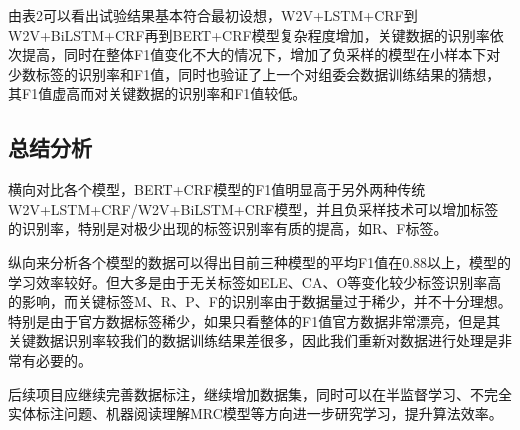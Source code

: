 \documentclass{article}
\begin{document}
由表2可以看出试验结果基本符合最初设想，W2V+LSTM+CRF到W2V+BiLSTM+CRF再到BERT+CRF模型复杂程度增加，关键数据的识别率依次提高，同时在整体F1值变化不大的情况下，增加了负采样的模型在小样本下对少数标签的识别率和F1值，同时也验证了上一个对组委会数据训练结果的猜想，其F1值虚高而对关键数据的识别率和F1值较低。

\newpage
\begin{center}
	\section{总结分析}
\end{center}


横向对比各个模型，BERT+CRF模型的F1值明显高于另外两种传统W2V+LSTM+CRF/W2V+BiLSTM+CRF模型，并且负采样技术可以增加标签的识别率，特别是对极少出现的标签识别率有质的提高，如R、F标签。

纵向来分析各个模型的数据可以得出目前三种模型的平均F1值在0.88以上，模型的学习效率较好。但大多是由于无关标签如ELE、CA、O等变化较少标签识别率高的影响，而关键标签M、R、P、F的识别率由于数据量过于稀少，并不十分理想。特别是由于官方数据标签稀少，如果只看整体的F1值官方数据非常漂亮，但是其关键数据识别率较我们的数据训练结果差很多，因此我们重新对数据进行处理是非常有必要的。

后续项目应继续完善数据标注，继续增加数据集，同时可以在半监督学习、不完全实体标注问题、机器阅读理解MRC模型等方向进一步研究学习，提升算法效率。

\newpage

\begin{center}
	
\end{center}
\end{document}
